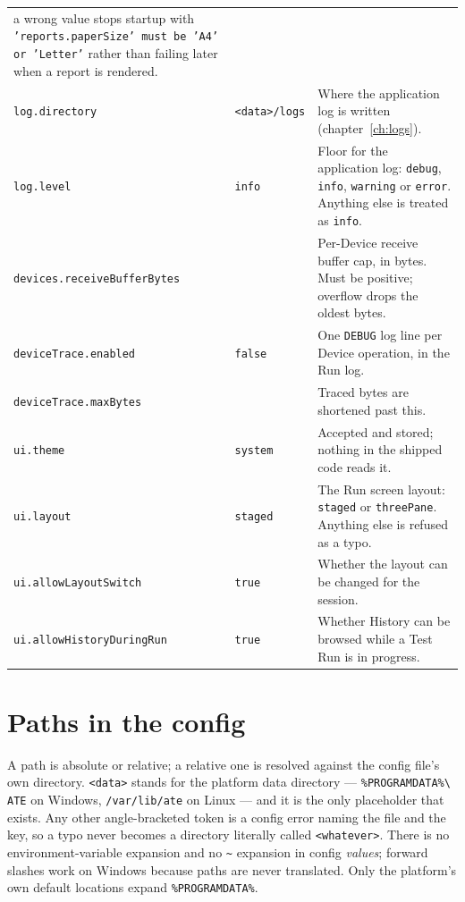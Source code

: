 \begin{longtable}{@{}>{\raggedright\arraybackslash}p{4.4cm}>{\raggedright\arraybackslash}p{3.0cm}>{\raggedright\arraybackslash}p{8.0cm}@{}}
  a wrong value stops startup with \texttt{'reports.paperSize' must be 'A4' or 'Letter'} rather than
  failing later when a report is rendered. \\
\texttt{log.directory} & \texttt{<data>/logs} & Where the application log is written
  (chapter~\ref{ch:logs}). \\
\texttt{log.level} & \texttt{info} & Floor for the application log: \texttt{debug}, \texttt{info},
  \texttt{warning} or \texttt{error}. Anything else is treated as \texttt{info}. \\
\texttt{devices.}\allowbreak\texttt{receiveBufferBytes} & 16777216 & Per-Device receive buffer cap, in bytes. Must be
  positive; overflow drops the oldest bytes. \\
\texttt{deviceTrace.enabled} & \texttt{false} & One \texttt{DEBUG} log line per Device operation, in
  the Run log. \\
\texttt{deviceTrace.maxBytes} & 256 & Traced bytes are shortened past this. \\
\texttt{ui.theme} & \texttt{system} & Accepted and stored; nothing in the shipped code reads it. \\
\texttt{ui.layout} & \texttt{staged} & The Run screen layout: \texttt{staged} or
  \texttt{threePane}. Anything else is refused as a typo. \\
\texttt{ui.allowLayoutSwitch} & \texttt{true} & Whether the layout can be changed for the session. \\
\texttt{ui.allowHistoryDuringRun} & \texttt{true} & Whether History can be browsed while a Test Run
  is in progress. \\
\bottomrule
\end{longtable}
\endgroup

\section{Paths in the config}

A path is absolute or relative; a relative one is resolved against the config file's own directory.
\texttt{<data>} stands for the platform data directory --- \texttt{\%PROGRAMDATA\%\textbackslash
ATE} on Windows, \texttt{/var/lib/ate} on Linux --- and it is the only placeholder that exists. Any
other angle-bracketed token is a config error naming the file and the key, so a typo never becomes
a directory literally called \texttt{<whatever>}. There is no environment-variable expansion and no
\texttt{\textasciitilde} expansion in config \emph{values}; forward slashes work on Windows because
paths are never translated. Only the platform's own default locations expand \texttt{\%PROGRAMDATA\%}.

